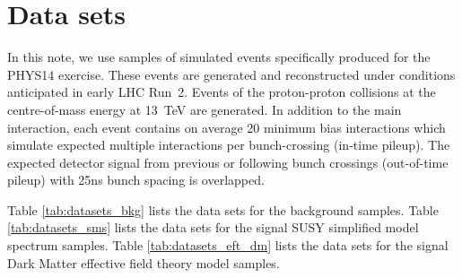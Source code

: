 \section{Data sets}
\label{sec:datasets}

In this note, we use samples of simulated events specifically produced
for the PHYS14 exercise. These events are generated and reconstructed
under conditions anticipated in early LHC Run~2. Events of the
proton-proton collisions at the centre-of-mass energy at 13~TeV are
generated. In addition to the main interaction, each event contains on
average 20 minimum bias interactions which simulate expected multiple
interactions per bunch-crossing (in-time pileup). The expected detector
signal from previous or following bunch crossings (out-of-time pileup)
with 25ns bunch spacing is overlapped.

Table \ref{tab:datasets_bkg} lists the data sets for the background
samples. Table \ref{tab:datasets_sms} lists the data sets for the signal
SUSY simplified model spectrum samples. Table \ref{tab:datasets_eft_dm}
lists the data sets for the signal
Dark Matter effective field theory model samples.


\begin{landscape}
\begin{table}[!h]
\scriptsize 
\label{tab:datasets_bkg}
\end{table}
\end{landscape}

\begin{landscape}
\begin{table}[!h]
\scriptsize 
\label{tab:datasets_sms}
\end{table}

\begin{table}[!h]
\scriptsize 
\label{tab:datasets_eft_dm}
\end{table}
\end{landscape}



